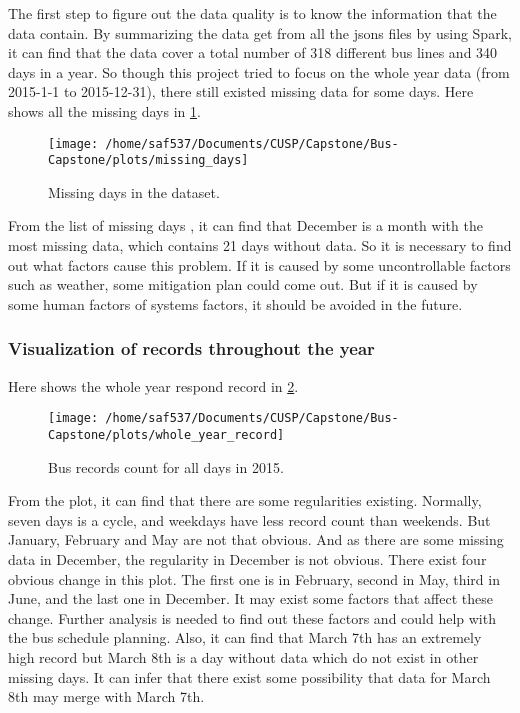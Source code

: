 \documentclass[12pt]{report}
\begin{document}
  The first step to figure out the data quality is to know the information that the data contain. By summarizing the data get from all the jsons files by using Spark, it can find that the data cover a total number of 318 different bus lines and 340 days in a year. So though this project tried to focus on the whole year data (from 2015-1-1 to 2015-12-31), there still existed missing data for some days. Here shows all the missing days in \ref{m_days}.
  
  \begin{figure}[!ht]
  \caption{Missing days in the dataset.}
  \label{m_days}
  \centering
    \texttt{[image: /home/saf537/Documents/CUSP/Capstone/Bus-Capstone/plots/missing\_days]}
\end{figure}

      From the list of missing days , it can find that December is a month with the most missing data, which contains 21 days without data. So it is necessary to find out what factors cause this problem. If it is caused by some uncontrollable factors such as weather, some mitigation plan could come out. But if it is caused by some human factors of systems factors, it should be avoided in the future.
      
      \subsubsection*{Visualization of records throughout the year}
      
        Here shows the whole year respond record in \ref{m_alldays}.



\begin{figure}[!ht]
  \caption{Bus records count for all days in 2015.}
  \label{m_alldays}
  \centering
    \texttt{[image: /home/saf537/Documents/CUSP/Capstone/Bus-Capstone/plots/whole\_year\_record]}
\end{figure}

   From the plot, it can find that there are some regularities existing. Normally, seven days is a cycle, and weekdays have less record count than weekends. But January, February and May are not that obvious. And as there are some missing data in December, the regularity in December is not obvious. 
      There exist four obvious change in this plot. The first one is in February, second in May, third in June, and the last one in December. It may exist some factors that affect these change. Further analysis is needed to find out these factors and could help with the bus schedule planning.
      Also, it can find that March 7th has an extremely high record but March 8th is a day without data which do not exist in other missing days. It can infer that there exist some possibility that data for March 8th may merge with March 7th.
      
\end{document}
